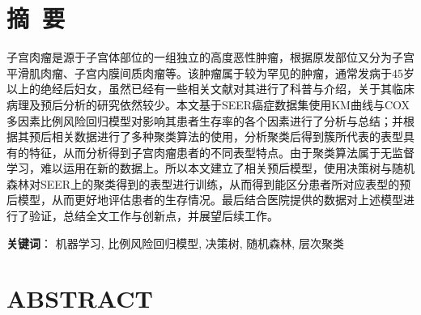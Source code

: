\newpage

{
    \let\clearpage\relax%
    \centering{}

    \vspace{8mm}

    \chapter*{摘\ 要}
}

子宫肉瘤是源于子宫体部位的一组独立的高度恶性肿瘤，根据原发部位又分为子宫平滑肌肉瘤、子宫内膜间质肉瘤等。该肿瘤属于较为罕见的肿瘤，通常发病于45岁以上的绝经后妇女，虽然已经有一些相关文献对其进行了科普与介绍，关于其临床病理及预后分析的研究依然较少。本文基于SEER癌症数据集使用KM曲线与COX多因素比例风险回归模型对影响其患者生存率的各个因素进行了分析与总结；并根据其预后相关数据进行了多种聚类算法的使用，分析聚类后得到簇所代表的表型具有的特征，从而分析得到子宫肉瘤患者的不同表型特点。由于聚类算法属于无监督学习，难以运用在新的数据上。所以本文建立了相关预后模型，使用决策树与随机森林对SEER上的聚类得到的表型进行训练，从而得到能区分患者所对应表型的预后模型，从而更好地评估患者的生存情况。最后结合医院提供的数据对上述模型进行了验证，总结全文工作与创新点，并展望后续工作。

\vspace{8mm}
\textbf{关键词}： 机器学习, 比例风险回归模型, 决策树, 随机森林, 层次聚类

\newpage
{
    \let\clearpage\relax%
    \centering{}
    \vspace{8mm}

    \chapter*{ABSTRACT}
}

